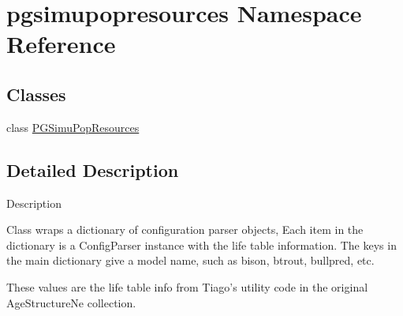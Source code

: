 \hypertarget{namespacepgsimupopresources}{}\section{pgsimupopresources Namespace Reference}
\label{namespacepgsimupopresources}
\subsection*{Classes}
\begin{DoxyCompactItemize}
\item 
class \hyperlink{classpgsimupopresources_1_1PGSimuPopResources}{P\+G\+Simu\+Pop\+Resources}
\end{DoxyCompactItemize}


\subsection{Detailed Description}
\begin{DoxyVerb}Description

Class wraps a dictionary of configuration parser
objects, Each item in the dictionary is 
a ConfigParser instance with the life table information. 
The keys in the main dictionary give a model name, such as 
bison, btrout, bullpred, etc.

These values are the life table info from Tiago's
utility code in the original AgeStructureNe 
collection.\end{DoxyVerb}
 